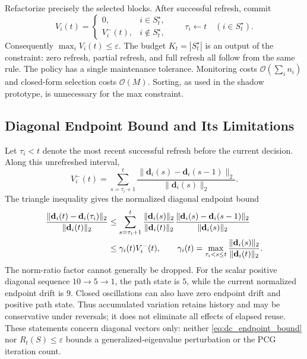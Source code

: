 Refactorize precisely the selected blocks. After successful refresh, commit
\begin{equation}
V_i(t)=\begin{cases}0,&i\in S_t^\star,\\
V_i^-(t),&i\notin S_t^\star,\end{cases}
\qquad
\tau_i\leftarrow t\quad(i\in S_t^\star).
\label{eq:dc_state_commit}
\end{equation}
Consequently $\max_i V_i(t)\le\varepsilon$.
The budget $K_t=|S_t^\star|$ is an output of the constraint: zero refresh,
partial refresh, and full refresh all follow from the same rule.
The policy has a single maintenance tolerance. Monitoring costs
$\mathcal O(\sum_i n_i)$ and closed-form selection costs $\mathcal O(M)$.
Sorting, as used in the shadow prototype, is unnecessary for the max constraint.

\subsection{Diagonal Endpoint Bound and Its Limitations}
Let $\tau_i<t$ denote the most recent successful refresh before the current
decision. Along this unrefreshed interval,
\begin{equation}
V_i^-(t)=\sum_{s=\tau_i+1}^{t}
\frac{\|\mathbf d_i(s)-\mathbf d_i(s-1)\|_2}{\|\mathbf d_i(s)\|_2}.
\label{eq:dc_path_sum}
\end{equation}
The triangle inequality gives the normalized diagonal endpoint bound
\begin{align}
\frac{\|\mathbf d_i(t)-\mathbf d_i(\tau_i)\|_2}{\|\mathbf d_i(t)\|_2}
&\le\sum_{s=\tau_i+1}^{t}
\frac{\|\mathbf d_i(s)\|_2}{\|\mathbf d_i(t)\|_2}
\frac{\|\mathbf d_i(s)-\mathbf d_i(s-1)\|_2}{\|\mathbf d_i(s)\|_2}
\notag\\
&\le\gamma_i(t)V_i^-(t),\qquad
\gamma_i(t)=\max_{\tau_i<s\le t}
\frac{\|\mathbf d_i(s)\|_2}{\|\mathbf d_i(t)\|_2}.
\label{eq:dc_endpoint_bound}
\end{align}
The norm-ratio factor cannot generally be dropped. For the scalar positive
diagonal sequence $10\to5\to1$, the path state is $5$, while the current
normalized endpoint drift is $9$. Closed oscillations can also have zero
endpoint drift and positive path state. Thus accumulated variation retains
history and may be conservative under reversals; it does not eliminate all
effects of elapsed reuse. These statements concern diagonal vectors only:
neither \eqref{eq:dc_endpoint_bound} nor $R_t(S)\le\varepsilon$ bounds a
generalized-eigenvalue perturbation or the PCG iteration count.

